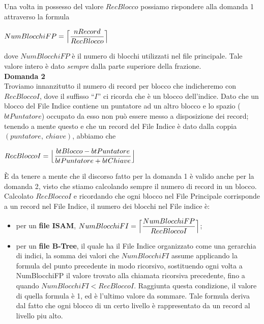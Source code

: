   Una volta in possesso del valore $RecBlocco$ possiamo rispondere alla domanda 1 attraverso la formula
  \begin{center}
   $NumBlocchiFP = \Bigl\lceil\dfrac{nRecord}{RecBlocco}\Bigr\rceil$
  \end{center}
  dove $NumBlocchiFP$ è il numero di blocchi utilizzati nel file principale. Tale valore intero è dato \emph{sempre} dalla parte 
  superiore della frazione.\\
  
  \noindent\textbf{\fontsize{14pt}{1em}Domanda 2}\\
  Troviamo innanzitutto il numero di record per blocco che indicheremo con $RecBloccoI$, dove il suffisso ``$I$''
  ci ricorda che è un blocco dell'indice. Dato che un blocco del File Indice contiene un puntatore ad un altro blocco
  e lo spazio ($btPuntatore$) occupato da esso non può essere messo a disposizione dei record; tenendo a mente questo e che un record
  del File Indice è dato dalla coppia $(puntatore,\ chiave)$, abbiamo che
  \begin{center}
   $RecBloccoI = \Bigl\lfloor \dfrac{btBlocco - btPuntatore}{btPuntatore + btChiave}\Bigr\rfloor$
  \end{center}
  \`E da tenere a mente che il discorso fatto per la domanda 1 è valido anche per la domanda 2, visto che stiamo calcolando
  sempre il numero di record in un blocco.\\
  
  Calcolato $RecBloccoI$ e ricordando che ogni blocco nel File Principale corrisponde a un record nel File Indice, il numero 
  dei blocchi nel File indice è:
  \begin{itemize}
   \item per un \textbf{file ISAM}, $NumBlocchiFI = \Bigl\lceil \dfrac{NumBlocchiFP}{RecBloccoI}\Bigr\rceil$;
   \item per un \textbf{file B-Tree}, il quale ha il File Indice organizzato come una gerarchia di indici,
   la somma dei valori che $NumBlocchiFI$ assume applicando la formula del punto precedente
   in modo ricorsivo, sostituendo ogni volta a NumBlocchiFP il valore trovato alla chiamata ricorsiva precedente, fino a quando
   $NumBlocchiFI < RecBloccoI$. Raggiunta questa condizione, il valore di quella formula è 1, ed è l'ultimo valore da sommare.
   Tale formula deriva dal fatto che ogni blocco di un certo livello è rappresentato da un record al livello piu alto.
  \end{itemize}
  
